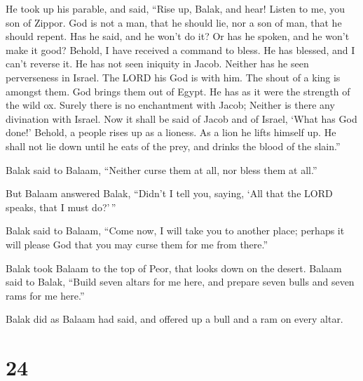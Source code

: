  He took up his parable, and said, ``Rise up, Balak, and
hear! Listen to me, you son of Zippor.  God is not a man,
that he should lie, nor a son of man, that he should repent. Has he
said, and he won't do it? Or has he spoken, and he won't make it good?
 Behold, I have received a command to bless. He has
blessed, and I can't reverse it.  He has not seen iniquity
in Jacob. Neither has he seen perverseness in Israel. The LORD his God
is with him. The shout of a king is amongst them.  God
brings them out of Egypt. He has as it were the strength of the wild ox.
 Surely there is no enchantment with Jacob; Neither is
there any divination with Israel. Now it shall be said of Jacob and of
Israel, `What has God done!'  Behold, a people rises up as
a lioness. As a lion he lifts himself up. He shall not lie down until he
eats of the prey, and drinks the blood of the slain.''

 Balak said to Balaam, ``Neither curse them at all, nor
bless them at all.''

 But Balaam answered Balak, ``Didn't I tell you, saying,
`All that the LORD speaks, that I must do?'\,''

 Balak said to Balaam, ``Come now, I will take you to
another place; perhaps it will please God that you may curse them for me
from there.''

 Balak took Balaam to the top of Peor, that looks down on
the desert.  Balaam said to Balak, ``Build seven altars for
me here, and prepare seven bulls and seven rams for me here.''

 Balak did as Balaam had said, and offered up a bull and a
ram on every altar.

\hypertarget{section-23}{%
\section{24}\label{section-23}}

